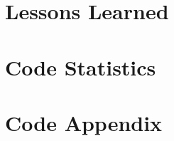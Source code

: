 \documentclass{article}
\begin{document}
\section{Lessons Learned}


\section{Code Statistics}

\section{Code Appendix}





\end{document}
